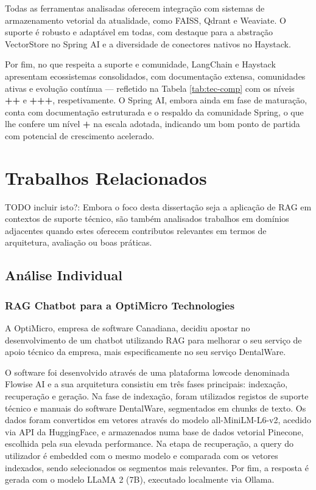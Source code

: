 Todas as ferramentas analisadas oferecem integração com sistemas de armazenamento vetorial da atualidade, como FAISS, Qdrant e Weaviate. O suporte é robusto e adaptável em todas, com destaque para a abstração VectorStore no Spring AI e a diversidade de conectores nativos no Haystack.

Por fim, no que respeita a suporte e comunidade, LangChain e Haystack apresentam ecossistemas consolidados, com documentação extensa, comunidades ativas e evolução contínua — refletido na Tabela \ref{tab:tec-comp} com os níveis \textbf{++} e \textbf{+++}, respetivamente. O Spring AI, embora ainda em fase de maturação, conta com documentação estruturada e o respaldo da comunidade Spring, o que lhe confere um nível \textbf{+} na escala adotada, indicando um bom ponto de partida com potencial de crescimento acelerado.

        

\section{Trabalhos Relacionados}

TODO incluir isto?: Embora o foco desta dissertação seja a aplicação de RAG em contextos de suporte técnico, são também analisados trabalhos em domínios adjacentes quando estes oferecem contributos relevantes em termos de arquitetura, avaliação ou boas práticas.

\subsection{Análise Individual}

\subsubsection{RAG Chatbot para a OptiMicro Technologies}

A OptiMicro, empresa de software Canadiana, decidiu apostar no desenvolvimento de um chatbot utilizando RAG para melhorar o seu serviço de apoio técnico da empresa, mais especificamente no seu serviço DentalWare.

O software foi desenvolvido através de uma plataforma lowcode denominada Flowise AI e a sua arquitetura consistiu em três fases principais: indexação, recuperação e geração. Na fase de indexação, foram utilizados registos de suporte técnico e manuais do software DentalWare, segmentados em chunks de texto. Os dados foram convertidos em vetores através do modelo all-MiniLM-L6-v2, acedido via API da HuggingFace, e armazenados numa base de dados vetorial Pinecone, escolhida pela sua elevada performance. Na etapa de recuperação, a query do utilizador é embedded com o mesmo modelo e comparada com os vetores indexados, sendo selecionados os segmentos mais relevantes. Por fim, a resposta é gerada com o modelo LLaMA 2 (7B), executado localmente via Ollama. 

